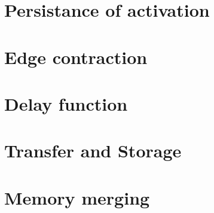 

	
\section{Persistance of activation}
\section{Edge contraction}
\section{Delay function}
\section{Transfer and Storage}
\section{Memory merging}
